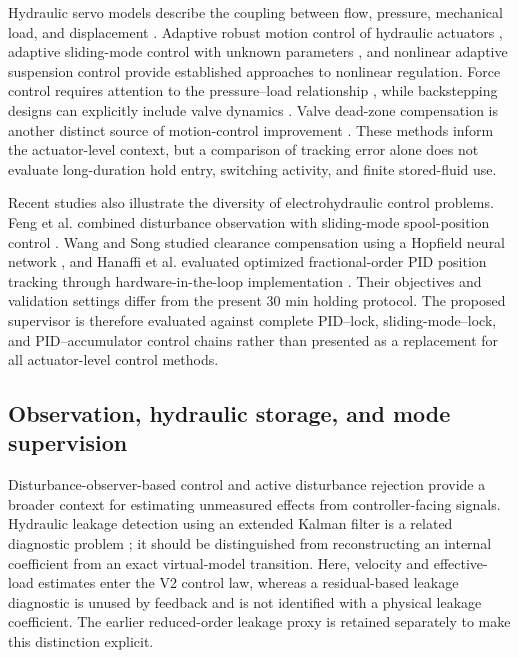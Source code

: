 \documentclass[machines,article,submit,pdftex,moreauthors]{Definitions/mdpi}
\begin{document}
Hydraulic servo models describe the coupling between flow, pressure, mechanical load, and displacement \cite{jelali2003}. Adaptive robust motion control of hydraulic actuators \cite{yao2000}, adaptive sliding-mode control with unknown parameters \cite{guan2008}, and nonlinear adaptive suspension control \cite{alleyne1995} provide established approaches to nonlinear regulation. Force control requires attention to the pressure--load relationship \cite{alleyne2000}, while backstepping designs can explicitly include valve dynamics \cite{choux2010}. Valve dead-zone compensation is another distinct source of motion-control improvement \cite{deng2017}. These methods inform the actuator-level context, but a comparison of tracking error alone does not evaluate long-duration hold entry, switching activity, and finite stored-fluid use.

Recent studies also illustrate the diversity of electrohydraulic control problems. Feng et al. combined disturbance observation with sliding-mode spool-position control \cite{feng2025}. Wang and Song studied clearance compensation using a Hopfield neural network \cite{wang2024}, and Hanaffi et al. evaluated optimized fractional-order PID position tracking through hardware-in-the-loop implementation \cite{hanaffi2026}. Their objectives and validation settings differ from the present 30 min holding protocol. The proposed supervisor is therefore evaluated against complete PID--lock, sliding-mode--lock, and PID--accumulator control chains rather than presented as a replacement for all actuator-level control methods.

\subsection{Observation, hydraulic storage, and mode supervision}
Disturbance-observer-based control \cite{chen2016} and active disturbance rejection \cite{han2009} provide a broader context for estimating unmeasured effects from controller-facing signals. Hydraulic leakage detection using an extended Kalman filter is a related diagnostic problem \cite{an2005}; it should be distinguished from reconstructing an internal coefficient from an exact virtual-model transition. Here, velocity and effective-load estimates enter the V2 control law, whereas a residual-based leakage diagnostic is unused by feedback and is not identified with a physical leakage coefficient. The earlier reduced-order leakage proxy is retained separately to make this distinction explicit.
\end{document}
